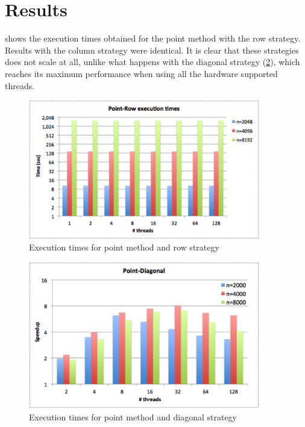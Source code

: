 \documentclass[../thesis]{subfiles}
\begin{document}
	\section{Results}
	\label{sec:multicore:results}

	 shows the execution times obtained for the point method with the row strategy. Results with the column strategy were identical. It is clear that these strategies does not scale at all, unlike what happens with the diagonal strategy (\cref{fig:multicore:point:diagonal:times}), which reaches its maximum performance when using all the hardware supported threads.

	\begin{figure}[hp]
		\begin{center}
			\includegraphics[width=0.9\textwidth]{assets/images/multicore/point-row.png}
		\end{center}
		\caption{Execution times for point method and row strategy}
		\label{fig:multicore:point:row:times}
	\end{figure}

	\begin{figure}[hp]
		\begin{center}
			\includegraphics[width=0.9\textwidth]{assets/images/multicore/point-diagonal.png}
		\end{center}
		\caption{Execution times for point method and diagonal strategy}
		\label{fig:multicore:point:diagonal:times}
	\end{figure}
\end{document}
